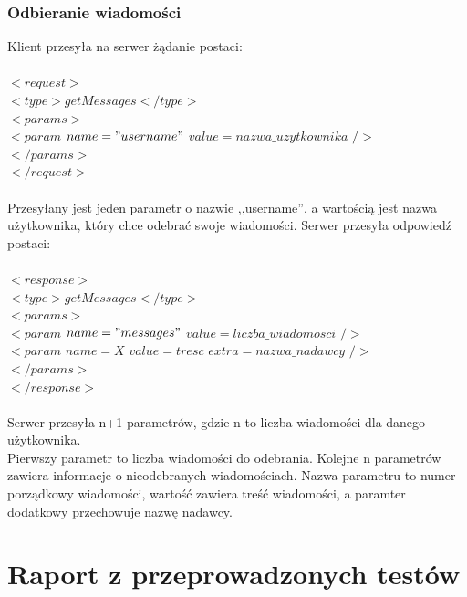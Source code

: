 \documentclass[a4paper,12pt]{article}
\begin{document}
\subsubsection[Odbieranie wiadomości]{Odbieranie wiadomości}
Klient przesyła na serwer żądanie postaci:\\\\
\noindent  $<request>$\\
\indent    $<type>getMessages</type>$\\
\indent    $<params>$\\
\indent \indent $<param$ $name="username"$ $value=nazwa\_uzytkownika$ $/>$\\
\indent    $</params>$\\
$</request>$\\\\

\noindent Przesyłany jest jeden parametr o nazwie ,,username'', a wartością jest nazwa użytkownika, który chce odebrać swoje wiadomości.
Serwer przesyła odpowiedź postaci:\\\\
\noindent  $<response>$\\
\indent    $<type>getMessages</type>$\\
\indent    $<params>$\\
\indent \indent $<param$ $name="messages"$ $value=liczba\_wiadomosci$ $/>$\\
\indent \indent $<param$ $name=X$ $value=tresc$ $extra=nazwa\_nadawcy$ $/>$\\
\indent    $</params>$\\
$</response>$\\\\

\noindent Serwer przesyła n+1 parametrów, gdzie n to liczba wiadomości dla danego użytkownika.\\
Pierwszy parametr to liczba wiadomości do odebrania. Kolejne n parametrów zawiera informacje o nieodebranych wiadomościach. Nazwa parametru to numer porządkowy wiadomości, wartość zawiera treść wiadomości, a paramter dodatkowy przechowuje nazwę nadawcy.

\section[Raport z przeprowadzonych testów]{Raport z przeprowadzonych testów}
\end{document}
